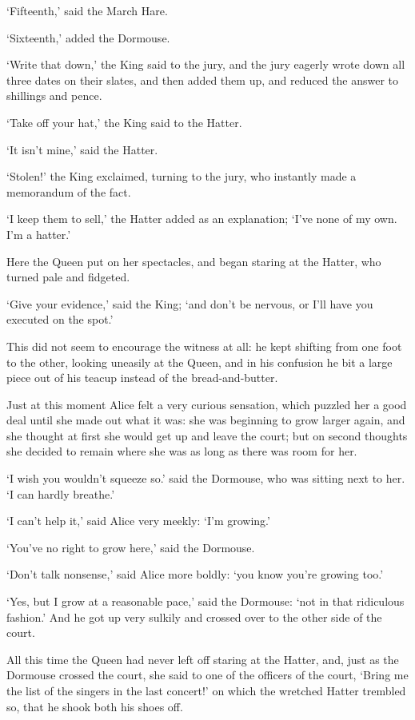 \documentclass[12pt]{book}
\begin{document}
\begin{Parallel}[p]{}{}
{‘Fifteenth,’ said the March Hare.

‘Sixteenth,’ added the Dormouse.

‘Write that down,’ the King said to the jury, and the jury eagerly wrote down all three dates on their slates, and then added them up, and reduced the answer to shillings and pence.

‘Take off your hat,’ the King said to the Hatter.

‘It isn’t mine,’ said the Hatter.

‘Stolen!’ the King exclaimed, turning to the jury, who instantly made a memorandum of the fact.

‘I keep them to sell,’ the Hatter added as an explanation; ‘I’ve none of my own. I’m a hatter.’

Here the Queen put on her spectacles, and began staring at the Hatter, who turned pale and fidgeted.

‘Give your evidence,’ said the King; ‘and don’t be nervous, or I’ll have you executed on the spot.’

This did not seem to encourage the witness at all: he kept shifting from one foot to the other, looking uneasily at the Queen, and in his confusion he bit a large piece out of his teacup instead of the bread-and-butter.

Just at this moment Alice felt a very curious sensation, which puzzled her a good deal until she made out what it was: she was beginning to grow larger again, and she thought at first she would get up and leave the court; but on second thoughts she decided to remain where she was as long as there was room for her.

‘I wish you wouldn’t squeeze so.’ said the Dormouse, who was sitting next to her. ‘I can hardly breathe.’

‘I can’t help it,’ said Alice very meekly: ‘I’m growing.’

‘You’ve no right to grow here,’ said the Dormouse.

‘Don’t talk nonsense,’ said Alice more boldly: ‘you know you’re growing too.’

‘Yes, but I grow at a reasonable pace,’ said the Dormouse: ‘not in that ridiculous fashion.’ And he got up very sulkily and crossed over to the other side of the court.

All this time the Queen had never left off staring at the Hatter, and, just as the Dormouse crossed the court, she said to one of the officers of the court, ‘Bring me the list of the singers in the last concert!’ on which the wretched Hatter trembled so, that he shook both his shoes off.

}
\end{Parallel}
\end{document}
